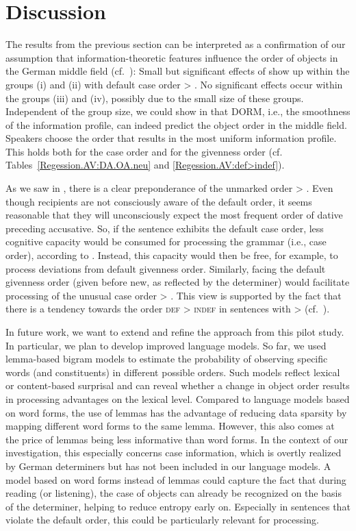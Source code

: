 \documentclass[output=paper,colorlinks,citecolor=brown]{langscibook}
\begin{document}
\section{Discussion}\label{sec:discussion}
The results from the previous section can be interpreted as a confirmation of our assumption that infor\-mation-theoretic features influence the order of objects in the German middle field (cf.\ ): Small but significant effects of \DDIFF show up within the groups (i) and (ii) with default case order \ReichDat{} > \ReichAcc{}. No significant effects occur within the groups (iii) and (iv), possibly due to the small size of these groups. Independent of the group size, we could show in  that DORM, i.e., the smoothness of the information profile, can indeed predict the object order in the middle field. Speakers choose the order that results in the most uniform information profile. This holds both for the case order and for the givenness order (cf. Tables~\ref{Regession.AV:DA.OA.neu} and \ref{Regession.AV:def>indef}).

As we saw in , there is a clear preponderance of the unmarked order \ReichDat{} > \ReichAcc{}. Even though recipients are not consciously aware of the default order, it seems reasonable that they will unconsciously expect the most frequent order of dative preceding accusative. So, if the sentence exhibits the default case order, less cognitive capacity would be consumed for processing the grammar (i.e., case order), according to \citet{Futrell}. Instead, this capacity would then be free, for example, to process deviations from default givenness order.
Similarly, facing the default givenness order (given before new, as reflected by the determiner) would facilitate processing of the unusual case order \ReichAcc{} > \ReichDat{}. This view is supported by the fact that there is a tendency towards the order \textsc{def} > \textsc{indef} in sentences with \ReichAcc{} > \ReichDat{} (cf.\ ).

In future work, we want to extend and refine the approach from this pilot study. 
In particular, we plan to develop improved language models. 
So far, we used lemma-based bigram models to estimate the probability of observing specific words (and constituents) in different possible orders. Such models reflect lexical or content-based surprisal and can reveal whether a change in object order results in processing advantages on the lexical level. Compared to language models based on word forms, the use of lemmas has the advantage of reducing data sparsity by mapping different word forms to the same lemma. 
However, this also comes at the price of lemmas being less informative than word forms. In the context of our investigation, this especially concerns case information, which is overtly realized by German determiners but has not been included in our language models. A model based on word forms instead of lemmas could capture the fact that during reading (or listening), the case of objects can already be recognized on the basis of the determiner, helping to reduce entropy early on. Especially in sentences that violate the default order, this could be particularly relevant for processing.
\end{document}
